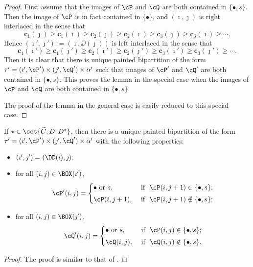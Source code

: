 \documentclass[ssunip]{subfiles}
\begin{document}
   \begin{proof}
    First assume that the images of $\cP$ and $\cQ$ are both contained in $\{\bullet, s\}$. Then  the image of $\cP$  is in fact contained in $\{\bullet\}$, and $(\imath, \jmath)$ is  right interlaced in the sense that 
 \[
 \mathbf{c}_1(\jmath)\geq \mathbf{c}_1(\imath)\geq \mathbf{c}_2(\jmath)\geq \mathbf{c}_2(\imath)\geq \mathbf{c}_3(\jmath)\geq \mathbf{c}_3(\imath) \geq \cdots.
 \]
 Hence $ (\imath',\jmath'):= (\imath,\DD(\jmath))$ is left interlaced in the sense that 
 \[
 \mathbf{c}_1(\imath')\geq \mathbf{c}_1(\jmath')\geq \mathbf{c}_2(\imath')\geq \mathbf{c}_2(\jmath')\geq \mathbf{c}_3(\imath')\geq \mathbf{c}_3(\jmath') \geq \cdots.
 \]
 Then it is clear that there is  unique painted bipartition of the form  $\tau'=(\imath',\cP')\times (\jmath',\cQ')\times \alpha'$ such that images of $\cP'$ and $\cQ'$ are both contained in $\{\bullet, s\}$. This proves the lemma in the special case when the images of $\cP$ and $\cQ$ are both contained in $\{\bullet, s\}$. 
 
 The proof of the lemma in the general case is easily reduced to this special case. 
   \end{proof}
    \begin{lem}\label{lemDDn2}
    If $\star \in \set{ \widetilde C, D,D^*}$, then there is a unique painted bipartition of the form $\tau'= (\imath',\cP')\times (\jmath',\cQ')\times \alpha'$ with the following properties:
  \begin{itemize}
        \item $
   (\imath',\jmath')= (\DD(\imath),\jmath); \smallskip
   $
   \item for all $(i,j)\in \BOX(\imath')$,
   \[
     \cP'(i,j)=\begin{cases}   
    \bullet \textrm{ or } s,&\textrm{ if  $\ \cP(i,j+1)\in \{\bullet, s\}$;} \smallskip \\
  \cP(i,j+1),& \textrm{ if $\ \cP(i,j+1)\notin \{\bullet, s\}$};\end{cases}
   \]
   \item for all $(i,j)\in \BOX(\jmath')$,
   \[
     \cQ'(i,j)=\begin{cases}   
    \bullet \textrm{ or } s,&\textrm{ if  $\ \cP(i,j)\in \{\bullet, s\}$;} \smallskip \\
  \cQ(i,j), & \textrm{ if $\ \cQ(i,j)\notin \{\bullet, s\}$}.  \end{cases}
   \]
  
    \end{itemize}
\end{lem}
\begin{proof}
  The proof is similar to that of . 
  
\end{proof}
\end{document}

